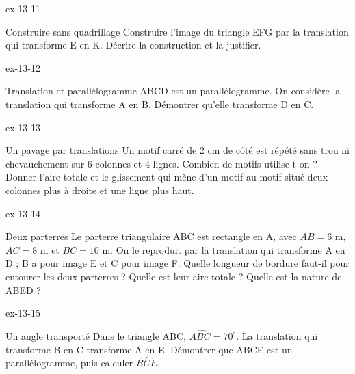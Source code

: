 \begin{blocLivre}{ex-13-11}\begin{exercice}[3]{Construire sans quadrillage}
Construire l’image du triangle EFG par la translation qui transforme E en K. Décrire la construction et la justifier.
\label{fig-ex-13-11}
\end{exercice}\end{blocLivre}
\begin{blocLivre}{ex-13-12}\begin{exercice}[3]{Translation et parallélogramme}
ABCD est un parallélogramme. On considère la translation qui transforme A en B. Démontrer qu’elle transforme D en C.
\label{fig-ex-13-12}
\end{exercice}\end{blocLivre}
\begin{blocLivre}{ex-13-13}\begin{exercice}[3]{Un pavage par translations}
Un motif carré de 2 cm de côté est répété sans trou ni chevauchement sur 6 colonnes et 4 lignes. Combien de motifs utilise-t-on ? Donner l’aire totale et le glissement qui mène d’un motif au motif situé deux colonnes plus à droite et une ligne plus haut.
\label{fig-ex-13-13}
\end{exercice}\end{blocLivre}
\begin{blocLivre}{ex-13-14}\begin{exercice}[3]{Deux parterres}
Le parterre triangulaire ABC est rectangle en A, avec $AB=6$ m, $AC=8$ m et $BC=10$ m. On le reproduit par la translation qui transforme A en D ; B a pour image E et C pour image F. Quelle longueur de bordure faut-il pour entourer les deux parterres ? Quelle est leur aire totale ? Quelle est la nature de ABED ?
\label{fig-ex-13-14}
\end{exercice}\end{blocLivre}
\begin{blocLivre}{ex-13-15}\begin{exercice}[3]{Un angle transporté}
Dans le triangle ABC, $\widehat{ABC}=70^\circ$. La translation qui transforme B en C transforme A en E. Démontrer que ABCE est un parallélogramme, puis calculer $\widehat{BCE}$.
\label{fig-ex-13-15}
\end{exercice}\end{blocLivre}

\clearpage
